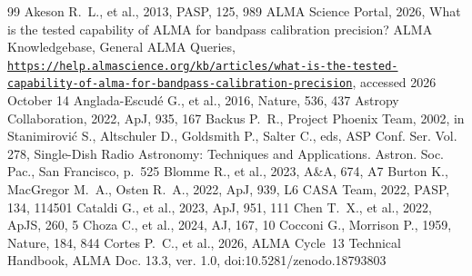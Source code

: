 \documentclass[twocolumn,twocolappendix,numberedappendix,appendixfloats]{openjournal}
\begin{document}
\begin{thebibliography}{99}
 Akeson R.~L., et al., 2013, PASP, 125, 989
 ALMA Science Portal, 2026, What is the tested capability of ALMA for bandpass calibration precision? ALMA Knowledgebase, General ALMA Queries, \href{https://help.almascience.org/kb/articles/what-is-the-tested-capability-of-alma-for-bandpass-calibration-precision}{\texttt{https://help.almascience.org/\allowbreak kb/\allowbreak articles/\allowbreak what-is-the-tested-\allowbreak capability-of-alma-for-\allowbreak bandpass-calibration-\allowbreak precision}}, accessed 2026 October 14
 Anglada-Escud\'e G., et al., 2016, Nature, 536, 437
 Astropy Collaboration, 2022, ApJ, 935, 167
 Backus P.~R., Project Phoenix Team, 2002, in Stanimirovi\'{c} S., Altschuler D., Goldsmith P., Salter C., eds, ASP Conf. Ser. Vol. 278, Single-Dish Radio Astronomy: Techniques and Applications. Astron. Soc. Pac., San Francisco, p.~525
 Blomme R., et al., 2023, A\&A, 674, A7
 Burton K., MacGregor M.~A., Osten R.~A., 2022, ApJ, 939, L6
 CASA Team, 2022, PASP, 134, 114501
 Cataldi G., et al., 2023, ApJ, 951, 111
 Chen T.~X., et al., 2022, ApJS, 260, 5
 Choza C., et al., 2024, AJ, 167, 10
 Cocconi G., Morrison P., 1959, Nature, 184, 844
 Cortes P.~C., et al., 2026, ALMA Cycle~13 Technical Handbook, ALMA Doc. 13.3, ver. 1.0, doi:10.5281/zenodo.18793803

\end{thebibliography}
\end{document}
